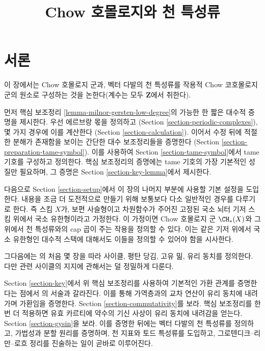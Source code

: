 

%


\title{Chow 호몰로지와 천 특성류}

\maketitle

\label{section-phantom}


\tableofcontents


\section{서론}
\label{section-introduction}

\noindent
이 장에서는 Chow 호몰로지 군과, 벡터 다발의 천 특성류를 작용적
Chow 코호몰로지 군의 원소로 구성하는 것을 논한다(계수는 모두
$\mathbf{Z}$에서 취한다).

\medskip\noindent
먼저 핵심 보조정리 \ref{lemma-milnor-gersten-low-degree}의 가능한 한
짧은 대수적 증명을 제시한다. 우선 에르브랑 몫을 정의하고
(Section \ref{section-periodic-complexes}), 몇 가지 경우에 이를 계산한다
(Section \ref{section-calculation}). 이어서 수정 뒤에 적절한 분해가
존재함을 보이는 간단한 대수 보조정리들을 증명한다
(Section \ref{section-preparation-tame-symbol}). 이를 사용하여
Section \ref{section-tame-symbol}에서 tame 기호를 구성하고 정의한다.
핵심 보조정리의 증명에는 tame 기호의 가장 기본적인 성질만 필요하며,
그 증명은 Section \ref{section-key-lemma}에서 제시한다.

\medskip\noindent
다음으로 Section \ref{section-setup}에서 이 장의 나머지 부분에 사용할
기본 설정을 도입한다. 내용을 조금 더 도전적으로 만들기 위해 보통보다
다소 일반적인 경우를 다루기로 한다. 즉 스킴 $X$가, 보편 사슬형이고
차원함수가 주어진 고정된 국소 뇌터 기저 스킴 위에서 국소 유한형이라고
가정한다. 이 가정이면 Chow 호몰로지 군 $\CH_*(X)$와 그 위에서 천
특성류와의 cap 곱이 주는 작용을 정의할 수 있다. 이는 같은 기저 위에서
국소 유한형인 대수적 스택에 대해서도 이들을 정의할 수 있어야 함을
시사한다.

\medskip\noindent
그다음에는 \cite{F}의 처음 몇 장을 따라 사이클, 평탄 당김, 고유 밂,
유리 동치를 정의한다. 다만 관련 사이클의 지지에 관해서는 덜 정밀하게
다룬다.

\medskip\noindent
Section \ref{section-key}에서 위 핵심 보조정리를 사용하여 기본적인
가환 관계를 증명한다는 점에서 \cite{F}의 서술과 갈라진다. 이를 통해
가역층과의 교차 연산이 유리 동치에 내려가며 가환임을 증명한다.
Section \ref{section-commutativity}를 보라. 핵심 보조정리를 한 번 더
적용하면 유효 카르티에 약수의 기신 사상이 유리 동치에 내려감을
얻는다. Section \ref{section-gysin}을 보라. 이를 증명한 뒤에는 벡터
다발의 천 특성류를 정의하고, 가법성과 분할 원리를 증명하며, 천 지표와
토드 특성류를 도입하고, 그로텐디크--리만--로흐 정리를 진술하는 일이
곧바로 이루어진다.


